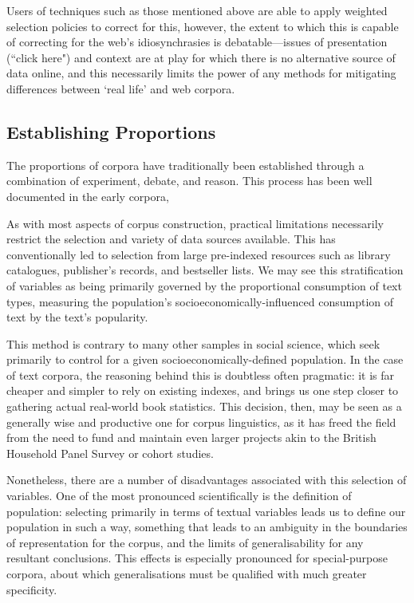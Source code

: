 Users of techniques such as those mentioned above are able to apply weighted selection policies to correct for this, however, the extent to which this is capable of correcting for the web's idiosynchrasies is debatable---issues of presentation (``click here") and context are at play for which there is no alternative source of data online, and this necessarily limits the power of any methods for mitigating differences between `real life' and web corpora. %


\subsection{Establishing Proportions}
The proportions of corpora have traditionally been established through a combination of experiment, debate, and reason.  This process has been well documented in the early corpora, 


As with most aspects of corpus construction, practical limitations necessarily restrict the selection and variety of data sources available.  This has conventionally led to selection from large pre-indexed resources such as library catalogues, publisher's records, and bestseller lists.  We may see this stratification of variables as being primarily governed by the proportional consumption of text types, measuring the population's socioeconomically-influenced consumption of text by the text's popularity.

This method is contrary to many other samples in social science, which seek primarily to control for a given socioeconomically-defined population.  In the case of text corpora, the reasoning behind this is doubtless often pragmatic: it is far cheaper and simpler to rely on existing indexes, and brings us one step closer to gathering actual real-world book statistics.  This decision, then, may be seen as a generally wise and productive one for corpus linguistics, as it has freed the field from the need to fund and maintain even larger projects akin to the British Household Panel Survey or cohort studies.

Nonetheless, there are a number of disadvantages associated with this selection of variables.  One of the most pronounced scientifically is the definition of population: selecting primarily in terms of textual variables leads us to define our population in such a way, something that leads to an ambiguity in the boundaries of representation for the corpus, and the limits of generalisability for any resultant conclusions.  This effects is especially pronounced for special-purpose corpora, about which generalisations must be qualified with much greater specificity.

